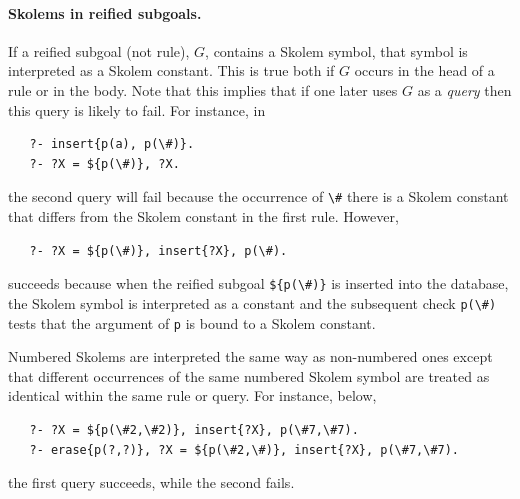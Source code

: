 \documentclass[11pt]{article}
\begin{document}
\paragraph{Skolems in reified subgoals.}
If a reified subgoal (not rule), $G$, contains a Skolem symbol, that symbol is
interpreted as a Skolem constant. This is true both if $G$ occurs in the head
of a rule or in the body.
Note that this implies that if one later uses $G$ as a \emph{query} then
this query is likely to fail. For instance, in
\begin{verbatim}
   ?- insert{p(a), p(\#)}.
   ?- ?X = ${p(\#)}, ?X.
\end{verbatim}
the second query will fail because the occurrence of \verb|\#| there is a
Skolem constant that differs from the Skolem constant in the first rule.
However,
\begin{verbatim}
   ?- ?X = ${p(\#)}, insert{?X}, p(\#).
\end{verbatim}
succeeds because when the reified subgoal \verb|${p(\#)}| is inserted into the
database, the Skolem symbol is interpreted as a constant and the subsequent
check \verb|p(\#)| tests that the argument of \texttt{p} is bound to a
Skolem constant. 

Numbered Skolems are interpreted the same way as non-numbered ones except
that different occurrences of the same numbered Skolem symbol are treated
as identical within the same rule or query.
For instance, below,
\begin{verbatim}
   ?- ?X = ${p(\#2,\#2)}, insert{?X}, p(\#7,\#7).
   ?- erase{p(?,?)}, ?X = ${p(\#2,\#)}, insert{?X}, p(\#7,\#7).
\end{verbatim}
the first query succeeds, while the second fails.
\end{document}
